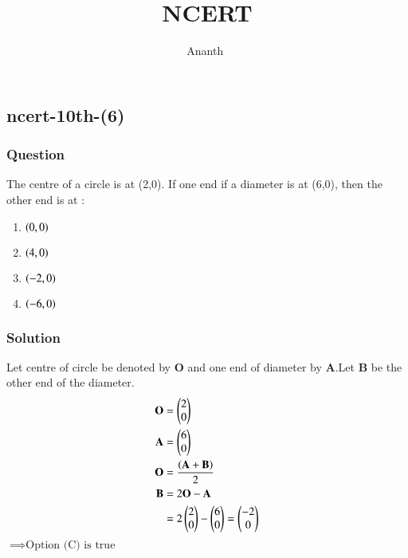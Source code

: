 \documentclass[journal,12pt,onecolumn]{IEEEtran}
\theoremstyle{remark}
\begin{document}

\vspace{3cm}

\title{NCERT}
\author{Ananth $^{}$%
}
\maketitle
\bigskip



\subsection{ncert-10th-(6)}
\subsubsection{Question}
The centre of a circle is at (2,0). If one end if a diameter is at (6,0), then the other end is at :
\begin{enumerate}
\item $\left(0,0\right)$
\item $\left(4,0\right)$
\item $\left(-2,0\right)$
\item $\left(-6,0\right)$
\end{enumerate}
\subsubsection{Solution}
Let centre of circle be denoted by $\textbf{O}$ and one end of diameter by $\textbf{A}$.Let $\textbf{B}$ be the other end of the diameter.
\begin{align}
\textbf{O} &=
    \begin{pmatrix}
2 \\
0 
\end{pmatrix}\\
\textbf{A} &=
    \begin{pmatrix}
6 \\
0 
\end{pmatrix}
\\
\textbf{O} &= \dfrac{\left(\textbf{A} + \textbf{B}\right)}{2}\\
\textbf{B} &= 2\textbf{O} - \textbf{A}\\
&=  2\begin{pmatrix}
2 \\
0 
\end{pmatrix} -  \begin{pmatrix}
6 \\
0 
\end{pmatrix}
=\begin{pmatrix}
   -2\\
   0
\end{pmatrix}
\end{align}
$\implies \text{Option (C) is true}$
\end{document}
